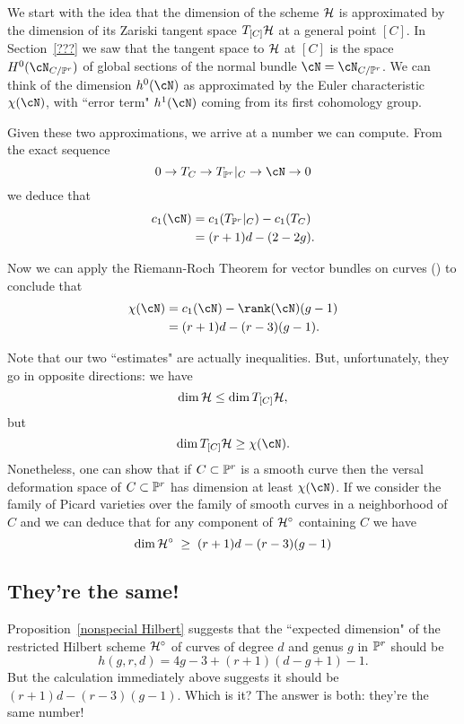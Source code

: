 We start with the idea that the dimension of the scheme $\cH$ is approximated by the dimension of its Zariski tangent space $T_{[C]}\cH$ at a general point $[C]$. In Section~\ref{???} we saw that the tangent space to $\cH$ at $[C]$ is the space $H^0(\cN_{C/\PP^r})$ of global sections of the normal bundle $\cN = \cN_{C/\PP^r}$. We can think of the dimension $h^0(\cN)$ as approximated by the Euler characteristic $\chi(\cN)$, with ``error term" $h^1(\cN)$ coming from its first cohomology group.

Given these two approximations, we arrive at a number we can  compute. From the exact sequence
$$
0 \to T_C \to T_{\PP^r}|_C \to \cN \to 0
$$
we deduce that
\begin{align*}
c_1(\cN) &= c_1(T_{\PP^r}|_C) - c_1(T_C) \\
&= (r+1)d - (2-2g).
\end{align*}

Now we can apply the Riemann-Roch Theorem for vector bundles on curves (\cite[Theorem ???]{3264}) to conclude that
\begin{align*}
\chi(\cN) &= c_1(\cN) - \rank(\cN)(g-1) \\
&= (r+1)d - (r-3)(g-1).
\end{align*}

Note that our two ``estimates" are actually inequalities. But, unfortunately, they go in opposite directions: we have
$$
\dim \cH \leq \dim T_{[C]}\cH,
$$
but 
$$
\dim T_{[C]}\cH \geq \chi(\cN).
$$
Nonetheless, one can show that if $C \subset \PP^r$ is a smooth curve then the versal deformation space of $C \subset \PP^r$ has dimension at least $\chi(\cN)$. If we consider the family of Picard varieties over the family of smooth curves in a neighborhood of $C$ and we can deduce that for any component of $\cH^\circ$ containing $C$ we have
$$
\dim \cH^\circ \; \geq \; (r+1)d - (r-3)(g-1)
$$

\subsection{They're the same!} Proposition~\ref{nonspecial Hilbert} suggests that the ``expected dimension" of the restricted Hilbert scheme $\cH^\circ$ of curves of degree $d$ and genus $g$ in $\PP^r$ should be 
$$
h(g,r,d) = 4g-3 + (r+1)(d-g+1) - 1.
$$
But the calculation immediately above suggests it should be $(r+1)d - (r-3)(g-1)$. Which is it? The answer is both: they're the same number!

